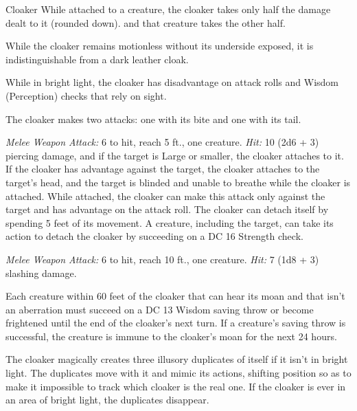 \documentclass[10pt,a4paper,twoside,bg=print,twocolumn,openany,nodeprecatedcode]{dndbook}
\begin{document}
\begin{DndMonster}[float=t]{Cloaker}
\DndMonsterBasics[
armor-class = {14 (natural armor)},
hit-points = {\DndDice{12d10 + 12}},
speed = {10 ft., fly 40 ft.}
]
\DndMonsterAbilityScores[
 str = 17,
 dex = 15,
 con = 12,
 int = 13,
 wis = 12,
 cha = 14
]
\DndMonsterDetails[
skills = {Stealth +5},
senses = {darkvision 60 ft., passive perception 11},
languages = {Deep Speech, Undercommon},
challenge = 8,
]
While attached to a creature, the cloaker takes only half the damage dealt to it (rounded down). and that creature takes the other half.

While the cloaker remains motionless without its underside exposed, it is indistinguishable from a dark leather cloak.

While in bright light, the cloaker has disadvantage on attack rolls and Wisdom (Perception) checks that rely on sight.

The cloaker makes two attacks: one with its bite and one with its tail.

\textsl{Melee Weapon Attack:} 6 to hit, reach 5 ft., one creature. \textsl{Hit:} 10 (2d6 + 3) piercing damage, and if the target is Large or smaller, the cloaker attaches to it. If the cloaker has advantage against the target, the cloaker attaches to the target's head, and the target is blinded and unable to breathe while the cloaker is attached. While attached, the cloaker can make this attack only against the target and has advantage on the attack roll. The cloaker can detach itself by spending 5 feet of its movement. A creature, including the target, can take its action to detach the cloaker by succeeding on a DC 16 Strength check.

\textsl{Melee Weapon Attack:} 6 to hit, reach 10 ft., one creature. \textsl{Hit:} 7 (1d8 + 3) slashing damage.

Each creature within 60 feet of the cloaker that can hear its moan and that isn't an aberration must succeed on a DC 13 Wisdom saving throw or become frightened until the end of the cloaker's next turn. If a creature's saving throw is successful, the creature is immune to the cloaker's moan for the next 24 hours.

The cloaker magically creates three illusory duplicates of itself if it isn't in bright light. The duplicates move with it and mimic its actions, shifting position so as to make it impossible to track which cloaker is the real one. If the cloaker is ever in an area of bright light, the duplicates disappear.


\end{DndMonster}
\end{document}
